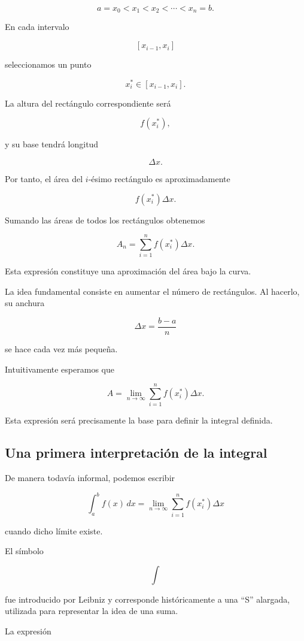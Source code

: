 \documentclass[12pt]{article}
\begin{document}
\[
a=x_0<x_1<x_2<\cdots<x_n=b.
\]

En cada intervalo

\[
[x_{i-1},x_i]
\]

seleccionamos un punto

\[
x_i^*\in[x_{i-1},x_i].
\]

La altura del rectángulo correspondiente será

\[
f(x_i^*),
\]

y su base tendrá longitud

\[
\Delta x.
\]

Por tanto, el área del $i$-ésimo rectángulo es aproximadamente

\[
f(x_i^*)\Delta x.
\]

Sumando las áreas de todos los rectángulos obtenemos

\[
A_n
=
\sum_{i=1}^{n}
f(x_i^*)\Delta x.
\]

Esta expresión constituye una aproximación del área bajo la curva.

La idea fundamental consiste en aumentar el número de rectángulos.
Al hacerlo, su anchura

\[
\Delta x=\frac{b-a}{n}
\]

se hace cada vez más pequeña.

Intuitivamente esperamos que

\[
A
=
\lim_{n\to\infty}
\sum_{i=1}^{n}
f(x_i^*)\Delta x.
\]

Esta expresión será precisamente la base para definir la integral
definida.

\subsection{Una primera interpretación de la integral}

De manera todavía informal, podemos escribir

\[
\boxed{
\int_a^b f(x)\,dx
=
\lim_{n\to\infty}
\sum_{i=1}^{n}
f(x_i^*)\Delta x
}
\]

cuando dicho límite existe.

El símbolo

\[
\int
\]

fue introducido por Leibniz y corresponde históricamente a una
``S'' alargada, utilizada para representar la idea de una suma.

La expresión
\end{document}
